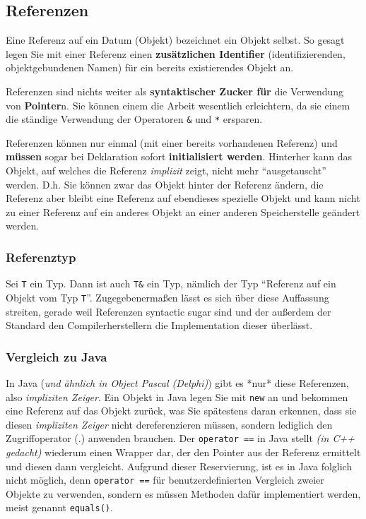 \documentclass[a4paper]{report}
\begin{document}
\subsection{Referenzen}

Eine Referenz auf ein Datum (Objekt) bezeichnet ein Objekt selbst. So gesagt legen Sie mit einer Referenz einen \textbf{zusätzlichen Identifier} (identifizierenden, objektgebundenen Namen) für ein bereits existierendes Objekt an.
\medskip

Referenzen sind nichts weiter als \textbf{syntaktischer Zucker für} die Verwendung von \textbf{Pointer}n. Sie können einem die Arbeit wesentlich erleichtern, da sie einem die ständige Verwendung der Operatoren \texttt{\&} und \texttt{*} ersparen.
\medskip

Referenzen können nur einmal (mit einer bereits vorhandenen Referenz) und \textbf{müssen} sogar bei Deklaration sofort \textbf{initialisiert werden}. Hinterher kann das Objekt, auf welches die Referenz \textit{implizit} zeigt, nicht mehr "`ausgetauscht"' werden. D.h. Sie können zwar das Objekt hinter der Referenz ändern, die Referenz aber bleibt eine Referenz auf ebendieses spezielle Objekt und kann nicht zu einer Referenz auf ein anderes Objekt an einer anderen Speicherstelle geändert werden.



\subsubsection{Referenztyp}
Sei \texttt{T} ein Typ. Dann ist auch \texttt{T\&} ein Typ, nämlich der Typ "`Referenz auf ein Objekt vom Typ \texttt{T}"'. {\tiny Zugegebenermaßen lässt es sich über diese Auffassung streiten, gerade weil Referenzen syntactic sugar sind und der außerdem der Standard den Compilerherstellern die Implementation dieser überlässt.}

\subsubsection{Vergleich zu Java}
In Java (\textit{und ähnlich in Object Pascal (Delphi)}) gibt es *nur* diese Referenzen, also \textit{impliziten Zeiger}. Ein Objekt in Java legen Sie mit \texttt{new} an und bekommen eine Referenz auf das Objekt zurück, was Sie spätestens daran erkennen, dass sie diesen \textit{impliziten Zeiger} nicht dereferenzieren müssen, sondern lediglich den Zugriffoperator (.) anwenden brauchen. Der \texttt{operator ==} in Java stellt \textsl{(in C++ gedacht)} wiederum einen Wrapper dar, der den Pointer aus der Referenz ermittelt und diesen dann vergleicht. Aufgrund dieser Reservierung, ist es in Java folglich nicht möglich, denn \texttt{operator ==} für benutzerdefinierten Vergleich zweier Objekte zu verwenden, sondern es müssen Methoden dafür implementiert werden, meist genannt \texttt{equals()}.
\end{document}
